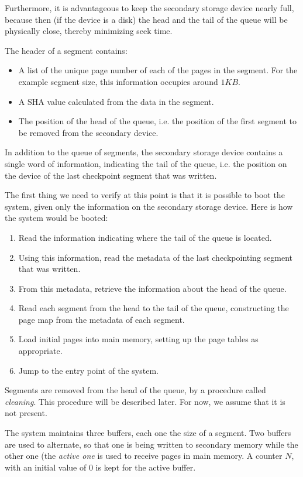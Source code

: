 Furthermore, it is advantageous to keep the secondary storage device
nearly full, because then (if the device is a disk) the head and the
tail of the queue will be physically close, thereby minimizing seek
time.

The header of a segment contains:

\begin{itemize}
\item A list of the unique page number of each of the pages in the
  segment.  For the example segment size, this information occupies
  around $1KB$.
\item A SHA value calculated from the data in the segment.
\item The position of the head of the queue, i.e. the position of the
  first segment to be removed from the secondary device.
\end{itemize}

In addition to the queue of segments, the secondary storage device
contains a single word of information, indicating the tail of the
queue, i.e. the position on the device of the last checkpoint segment
that was written.

The first thing we need to verify at this point is that it is possible
to boot the system, given only the information on the secondary
storage device.  Here is how the system would be booted:

\begin{enumerate}
\item Read the information indicating where the tail of the queue is
  located.
\item Using this information, read the metadata of the last
  checkpointing segment that was written.
\item From this metadata, retrieve the information about the head of
  the queue.
\item Read each segment from the head to the tail of the queue,
  constructing the page map from the metadata of each segment.
\item Load initial pages into main memory, setting up the page tables
  as appropriate.
\item Jump to the entry point of the system.
\end{enumerate}

Segments are removed from the head of the queue, by a procedure called
\emph{cleaning}.  This procedure will be described later.  For now, we
assume that it is not present.

The system maintains three buffers, each one the size of a segment.
Two buffers are used to alternate, so that one is being written to
secondary memory while the other one (the \emph{active one} is used to
receive pages in main memory.  A counter $N$, with an initial value of
$0$ is kept for the active buffer.
